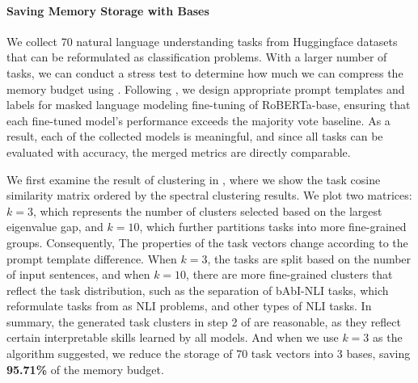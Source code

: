 \paragraph{Saving Memory Storage with Bases}
\label{sec:memory_70}
We collect 70 natural language understanding tasks from Huggingface \citep{wolf2019huggingface} datasets that can be reformulated as classification problems. With a larger number of tasks, we can conduct a stress test to determine how much we can compress the memory budget using . Following \citet{gao2020making, he2024localize}, we design appropriate prompt templates and labels for masked language modeling fine-tuning of RoBERTa-base, ensuring that each fine-tuned model’s performance exceeds the majority vote baseline. As a result, each of the collected models is meaningful, and since all tasks can be evaluated with accuracy, the merged metrics are directly comparable.

We first examine the result of clustering in , where we show the task cosine similarity matrix ordered by the spectral clustering results. We plot two matrices: $k = 3$, which represents the number of clusters selected based on the largest eigenvalue gap, and $k = 10$, which further partitions tasks into more fine-grained groups. Consequently, The properties of the task vectors change according to the prompt template difference. When $k = 3$, the tasks are split based on the number of input sentences, and when $k = 10$, there are more fine-grained clusters that reflect the task distribution, such as the separation of bAbI-NLI tasks, which reformulate tasks from \citet{weston2015towards} as NLI problems, and other types of NLI tasks. In summary, the generated task clusters in step 2 of  are reasonable, as they reflect certain interpretable skills learned by all models. And when we use $k = 3$ as the algorithm suggested, we reduce the storage of 70 task vectors into 3 bases, saving \textbf{95.71\%} of the memory budget.

